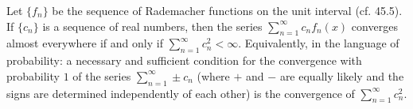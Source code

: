 Let $\{f_n\}$ be the sequence of Rademacher functions on the unit interval (cf. 45.5). If $\{c_n\}$ is a sequence of real numbers, then the series $\sum_{n=1}^{\infty} c_n f_n(x)$ converges almost everywhere if and only if $\sum_{n=1}^{\infty} c_n^2 < \infty$. Equivalently, in the language of probability: a necessary and sufficient condition for the convergence with probability $1$ of the series $\sum_{n=1}^{\infty} \pm c_n$ (where $+$ and $-$ are equally likely and the signs are determined independently of each other) is the convergence of $\sum_{n=1}^{\infty} c_n^2$.

